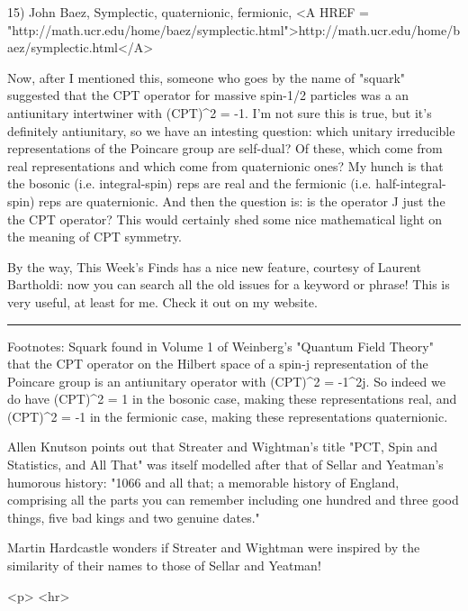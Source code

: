 15) John Baez, Symplectic, quaternionic, fermionic, 
<A HREF = "http://math.ucr.edu/home/baez/symplectic.html">http://math.ucr.edu/home/baez/symplectic.html</A>

Now, after I mentioned this, someone who goes by the name of "squark"
suggested that the CPT operator for massive spin-1/2 particles was a
an antiunitary intertwiner with (CPT)^{2} = -1.  I'm not sure this is
true, but it's definitely antiunitary, so we have an intesting question:
which unitary irreducible representations of the Poincare group are
self-dual?  Of these, which come from real representations and which
come from quaternionic ones?  My hunch is that the bosonic (i.e. 
integral-spin) reps are real and the fermionic (i.e. half-integral-spin) 
reps are quaternionic.  And then the question is: is the operator J
just the the CPT operator?  This would certainly shed some nice mathematical
light on the meaning of CPT symmetry.  

By the way, This Week's Finds has a nice new feature, courtesy of
Laurent Bartholdi: now you can search all the old issues for a keyword
or phrase!  This is very useful, at least for me.  Check it out on 
my website.

\par\noindent\rule{\textwidth}{0.4pt}


Footnotes: 
Squark found in Volume 1 of Weinberg's "Quantum Field
Theory" that the CPT operator on the Hilbert space of a spin-j
representation of the Poincare group is an antiunitary operator
with (CPT)^{2} = -1^{2j}.  So indeed we do have 
(CPT)^{2} = 1 in the bosonic case, making these representations
real, and (CPT)^{2} = -1 in the fermionic case, making these
representations quaternionic.


 Allen Knutson points out that Streater and Wightman's title "PCT,
Spin and Statistics, and All That" was itself modelled after that of
Sellar and Yeatman's humorous history: "1066 and all that; a memorable
history of England, comprising all the parts you can remember including
one hundred and three good things, five bad kings and two genuine dates."

Martin Hardcastle wonders if Streater and Wightman were inspired by the
similarity of their names to those of Sellar and Yeatman!






<p> <hr>



